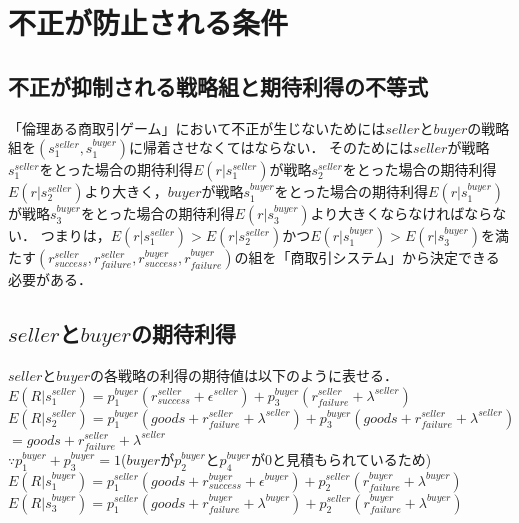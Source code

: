 \documentclass[twocolumn, a4j]{article}
\begin{document}
\section{不正が防止される条件}
\subsection{不正が抑制される戦略組と期待利得の不等式}
「倫理ある商取引ゲーム」において不正が生じないためには$seller$と$buyer$の戦略組を$(s^{seller}_1, s^{buyer}_1)$に帰着させなくてはならない．
そのためには$seller$が戦略$s^{seller}_1$をとった場合の期待利得$E(r|s^{seller}_1)$が戦略$s^{seller}_2$をとった場合の期待利得$E(r|s^{seller}_2)$より大きく，$buyer$が戦略$s^{buyer}_1$をとった場合の期待利得$E(r|s^{buyer}_1)$が戦略$s^{buyer}_3$をとった場合の期待利得$E(r|s^{buyer}_3)$より大きくならなければならない．
つまりは，$E(r|s^{seller}_1) > E(r|s^{seller}_2)$かつ$E(r|s^{buyer}_1) > E(r|s^{buyer}_3)$を満たす$(r^{seller}_{success}, r^{seller}_{failure}, r^{buyer}_{success}, r^{buyer}_{failure})$の組を「商取引システム」から決定できる必要がある．

\subsection{$ seller $と$ buyer $の期待利得}

$ seller $と$ buyer $の各戦略の利得の期待値は以下のように表せる．\\


$ E(R|s^{seller}_1) = p^{buyer}_1 (r^{seller}_{success} + \epsilon^{seller}) + p^{buyer}_3 (r^{seller}_{failure} + \lambda^{seller}) $ \\

$ E(R|s^{seller}_2) = p^{buyer}_1 (goods + r^{seller}_{failure} + \lambda^{seller}) + p^{buyer}_3 (goods + r^{seller}_{failure} + \lambda^{seller}) $ \\

$ = goods + r^{seller}_{failure} + \lambda^{seller} $ \\

$ \because p^{buyer}_1 + p^{buyer}_3 = 1 $($ buyer $が$ p^{buyer}_2 $と$ p^{buyer}_4 $が0と見積もられているため) \\

$ E(R|s^{buyer}_1) = p^{seller}_1 (goods + r^{buyer}_{success} + \epsilon^{buyer}) + p^{seller}_2 (r^{buyer}_{failure} + \lambda^{buyer}) $ \\

$ E(R|s^{buyer}_3) = p^{seller}_1(goods+r^{buyer}_{failure} + \lambda^{buyer}) + p^{seller}_2 (r^{buyer}_{failure} + \lambda^{buyer}) $ \\
\end{document}
